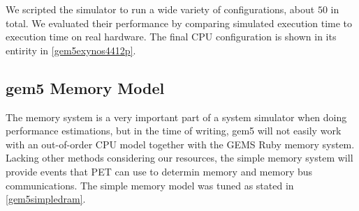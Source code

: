 We scripted the simulator to run a wide variety of configurations, about $50$ in
total. We evaluated their performance by comparing simulated execution time to
execution time on real hardware. The final CPU configuration is shown in its
entirity in \autoref{gem5exynos4412p}.


\subsection{gem5 Memory Model}
The memory system is a very important part of a system simulator when doing performance estimations, but
in the time of writing, gem5 will not easily work with an out-of-order CPU model together with the GEMS Ruby
memory system. Lacking other methods considering our resources, the simple memory system will provide events
that PET can use to determin memory and memory bus communications. The simple memory model was tuned as stated
in \autoref{gem5simpledram}.
